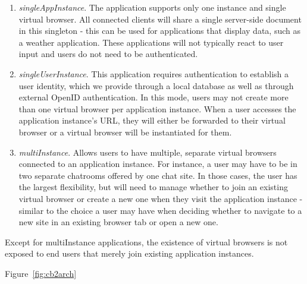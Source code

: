 \apphierarchyfig{}
\begin{enumerate}
\item \emph{singleAppInstance}. The application supports only one instance and single virtual browser.
    All connected clients will share a single server-side document in this singleton - this can be
    used for applications that display data, such as a weather application. These applications will not
    typically react to user input and users do not need to be authenticated.  
    
\item \emph{singleUserInstance}.  This application requires authentication to establish a
    user identity, which we provide through a local database as well as through external OpenID
    authentication.   In this mode, users may not create more than one virtual browser per
    application instance.  When a user accesses the application instance's URL, they will either
    be forwarded to their virtual browser or a virtual browser will be instantiated for them.
    
\item \emph{multiInstance}. 
    Allows users to have multiple, separate virtual browsers connected to an application
    instance. For instance, a user may have to be in two separate chatrooms offered by one chat site.
    In those cases, the user has the largest flexibility, but will need to manage whether
    to join an existing virtual browser or create a new one when they visit the application instance
    - similar to the choice a user may have when deciding whether to navigate to a new site in 
    an existing browser tab or open a new one.
\end{enumerate}
Except for multiInstance applications, the existence of virtual browsers is not exposed to 
end users that merely join existing application instances.

Figure~\ref{fig:cb2arch}

\newarchitectureoverview{}

\requestdispatchdiagram{}



